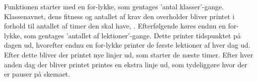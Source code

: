 Funktionen starter med en for-lykke, som gentages ’antal klasser’-gange. Klassenavnet, dens fitness og antallet af krav den overholder bliver printet i forhold til antallet af timer den skal have, . 
Efterfølgende køres endnu en for-lykke, som gentages ’antallet af lektioner’-gange. Dette printer tidspunktet på dagen ud, hvorefter endnu en for-lykke printer de første lektioner af hver dag ud.
Efter dette bliver der printet nye linjer ud, som starter de næste timer. Efter hver anden dag der bliver printet printes en ekstra linje ud, som tydeliggøre hvor der er pauser på skemaet.
